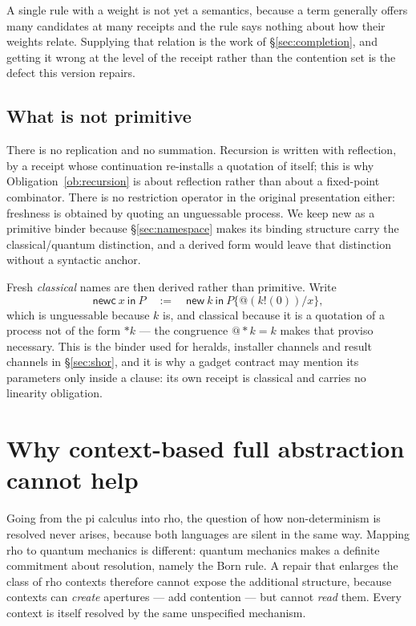 \documentclass[11pt,a4paper]{article}
\theoremstyle{plain}
\theoremstyle{definition}
\theoremstyle{remark}
\begin{document}
A single rule with a weight is not yet a semantics, because a term generally
offers many candidates at many receipts and the rule says nothing about how
their weights relate. Supplying that relation is the work of
\S\ref{sec:completion}, and getting it wrong at the level of the receipt rather
than the contention set is the defect this version repairs.

\subsection{What is not primitive}

There is no replication and no summation. Recursion is written with reflection,
by a receipt whose continuation re-installs a quotation of itself; this is why
Obligation~\ref{ob:recursion} is about reflection rather than about a fixed-point
combinator. There is no restriction operator in the original presentation
either: freshness is obtained by quoting an unguessable process. We keep
\textsf{new} as a primitive binder because \S\ref{sec:namespace} makes its
binding structure carry the classical/quantum distinction, and a derived form
would leave that distinction without a syntactic anchor.

Fresh \emph{classical} names are then derived rather than primitive. Write
\[
  \textsf{newc}\ x\ \textsf{in}\ P
  \quad:=\quad
  \textsf{new}\ k\ \textsf{in}\ P\{@(k!(0))/x\},
\]
which is unguessable because $k$ is, and classical because it is a quotation of
a process not of the form ${*}k$ --- the congruence $@{*}k = k$ makes that
proviso necessary. This is the binder used for heralds, installer channels and
result channels in \S\ref{sec:shor}, and it is why a gadget contract may mention
its parameters only inside a clause: its own receipt is classical and carries no
linearity obligation.

\section{Why context-based full abstraction cannot help}\label{sec:fa}

Going from the pi calculus into rho, the question of how non-determinism is
resolved never arises, because both languages are silent in the same way.
Mapping rho to quantum mechanics is different: quantum mechanics makes a
definite commitment about resolution, namely the Born rule. A repair that
enlarges the class of rho contexts therefore cannot expose the additional
structure, because contexts can \emph{create} apertures --- add contention ---
but cannot \emph{read} them. Every context is itself resolved by the same
unspecified mechanism.
\end{document}
